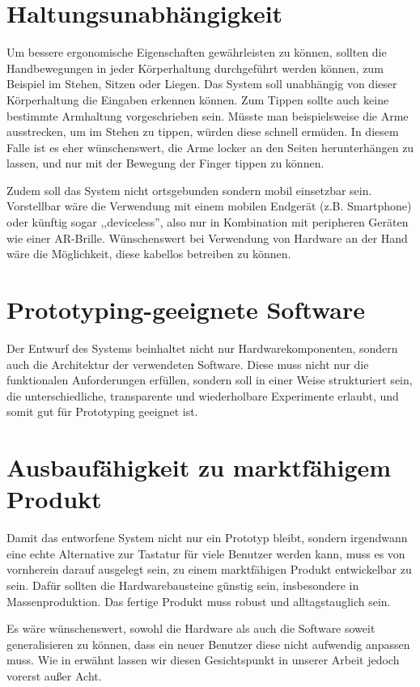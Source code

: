 \section{Haltungsunabhängigkeit}

Um bessere ergonomische Eigenschaften gewährleisten zu können, sollten die
Handbewegungen in jeder Körperhaltung durchgeführt werden können, zum Beispiel
im Stehen, Sitzen oder Liegen. Das System soll unabhängig von dieser
Körperhaltung die Eingaben erkennen können. Zum Tippen sollte auch keine
bestimmte Armhaltung vorgeschrieben sein. Müsste man beispielsweise die Arme
ausstrecken, um im Stehen zu tippen, würden diese schnell ermüden.  In diesem
Falle ist es eher wünschenswert, die Arme locker an den Seiten herunterhängen
zu lassen, und nur mit der Bewegung der Finger tippen zu können.

Zudem soll das System nicht ortsgebunden sondern mobil einsetzbar sein.
Vorstellbar wäre die Verwendung mit einem mobilen Endgerät (z.B. Smartphone)
oder künftig sogar ,,deviceless'', also nur in Kombination mit peripheren
Geräten wie einer AR-Brille.  Wünschenswert bei Verwendung von Hardware an
der Hand wäre die Möglichkeit, diese kabellos betreiben zu können.

\section{Prototyping-geeignete Software}

Der Entwurf des Systems beinhaltet nicht nur Hardwarekomponenten, sondern auch
die Architektur der verwendeten Software. Diese muss nicht nur die funktionalen
Anforderungen erfüllen, sondern soll in einer Weise strukturiert sein, die
unterschiedliche, transparente und wiederholbare Experimente erlaubt, und somit
gut für Prototyping geeignet ist.

\section{Ausbaufähigkeit zu marktfähigem Produkt}

Damit das entworfene System nicht nur ein Prototyp bleibt, sondern irgendwann
eine echte Alternative zur Tastatur für viele Benutzer werden kann, muss es von
vornherein darauf ausgelegt sein, zu einem marktfähigen Produkt entwickelbar zu
sein. Dafür sollten die Hardwarebausteine günstig sein, insbesondere in
Massenproduktion. Das fertige Produkt muss robust und alltagstauglich sein.

Es wäre wünschenswert, sowohl die Hardware als auch die Software soweit
generalisieren zu können, dass ein neuer Benutzer diese nicht aufwendig anpassen
muss. Wie in  erwähnt lassen wir diesen Gesichtspunkt
in unserer Arbeit jedoch vorerst außer Acht.

